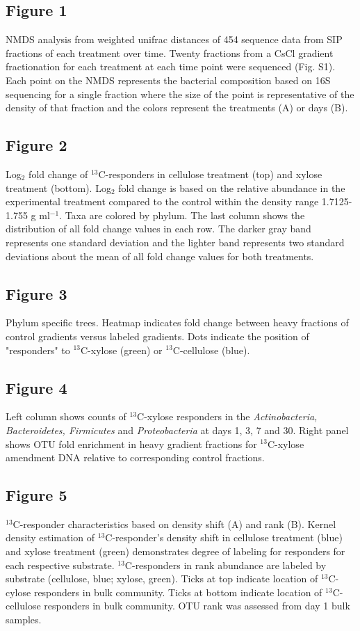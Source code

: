 \subsection{Figure 1}
NMDS analysis from weighted unifrac distances of 454 sequence data from SIP fractions of each treatment over time. Twenty fractions from a CsCl gradient fractionation for each treatment at each time point were sequenced (Fig. S1). Each point on the NMDS represents the bacterial composition based on 16S sequencing for a single fraction where the size of the point is representative of the density of that fraction and the colors represent the treatments (A) or days (B). 
\subsection{Figure 2}
Log$_{2}$ fold change of $^{13}$C-responders in cellulose
treatment (top) and xylose treatment (bottom).  Log$_{2}$ fold change is based
on the relative abundance in the experimental treatment compared to the control
within the density range 1.7125-1.755 g ml$^{-1}$. Taxa are
colored by phylum. The last column shows the distribution of all fold change values in each row. The darker gray band represents one standard deviation and the lighter band represents two standard deviations about the mean of all fold change values for both treatments.  

    
    \subsection{Figure 3}
Phylum specific trees. Heatmap indicates fold change between heavy fractions of control gradients versus labeled gradients. Dots indicate the position of "responders" to $^{13}$C-xylose (green) or $^{13}$C-cellulose (blue).\subsection{Figure 4}
Left column shows counts of $^{13}$C-xylose responders in the \textit{Actinobacteria, Bacteroidetes, Firmicutes} and \textit{Proteobacteria} at days 1, 3, 7 and 30. Right panel shows OTU fold enrichment in heavy gradient fractions for $^{13}$C-xylose amendment DNA relative to corresponding control fractions. 
    \subsection{Figure 5}
$^{13}$C-responder characteristics based on density shift (A) and rank (B).
Kernel density estimation of $^{13}$C-responder's density shift in cellulose
treatment (blue) and xylose treatment (green) demonstrates degree of labeling
for responders for each respective substrate. $^{13}$C-responders in rank
abundance are labeled by substrate (cellulose, blue; xylose, green). Ticks at top indicate
location of $^{13}$C-cylose responders in bulk community. Ticks at bottom indicate location of
$^{13}$C-cellulose responders in bulk community. OTU rank was assessed from day 1 bulk samples.